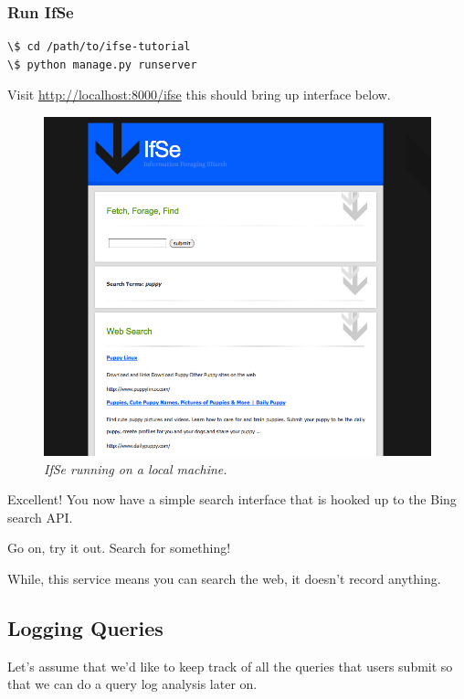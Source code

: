 \documentclass[letterpaper,10pt,english]{sphinxmanual}
\begin{document}
\subsubsection{Run IfSe}
\label{ifse-tutorial:run-ifse}
\begin{Verbatim}[commandchars=\\\{\}]
\$ cd /path/to/ifse-tutorial
\$ python manage.py runserver
\end{Verbatim}

Visit \href{http://localhost:8000/ifse}{http://localhost:8000/ifse} this should bring up interface below.
\begin{figure}[htbp]
\centering
\capstart

\includegraphics{puppy-ifse-before.png}
\caption{\emph{IfSe running on a local machine.}}\end{figure}

Excellent! You now have a simple search interface that is hooked up to the Bing search API.

Go on, try it out. Search for something!

While, this service means you can search the web, it doesn't record anything.


\subsection{Logging Queries}
\label{ifse-tutorial:logging-queries}
Let's assume that we'd like to keep track of all the queries that users submit so that we can do a query log analysis later on.
\end{document}
